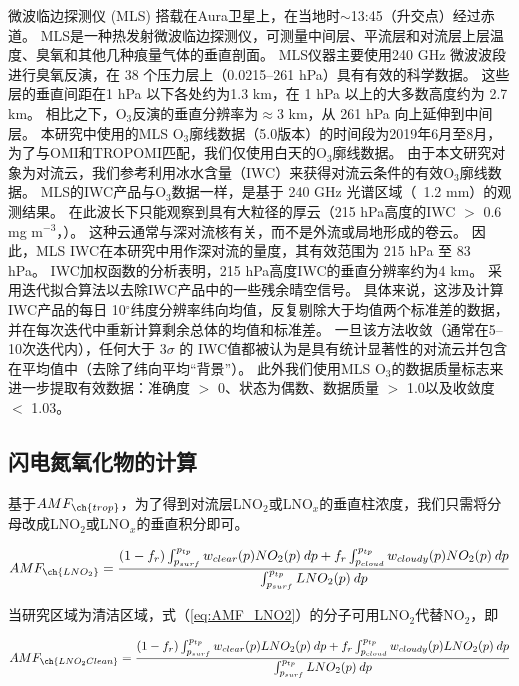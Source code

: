 微波临边探测仪 (MLS) 搭载在Aura卫星上，在当地时$\sim$13:45（升交点）经过赤道。
MLS是一种热发射微波临边探测仪，可测量中间层、平流层和对流层上层温度、臭氧和其他几种痕量气体的垂直剖面。
MLS仪器主要使用240 GHz 微波波段进行臭氧反演，在 38 个压力层上（0.0215--261 hPa）具有有效的科学数据。
这些层的垂直间距在1 hPa 以下各处约为1.3 km，在 1 hPa 以上的大多数高度约为 2.7 km。
相比之下，O$_3$反演的垂直分辨率为$\approx$3 km，从 261 hPa 向上延伸到中间层。
本研究中使用的MLS O$_3$廓线数据（5.0版本）的时间段为2019年6月至8月，为了与OMI和TROPOMI匹配，我们仅使用白天的O$_3$廓线数据。
由于本文研究对象为对流云，我们参考\citet{Livesey.2013}利用冰水含量（IWC）来获得对流云条件的有效O$_3$廓线数据。
MLS的IWC产品与O$_3$数据一样，是基于 240 GHz 光谱区域（~1.2 mm）的观测结果。
在此波长下只能观察到具有大粒径的厚云（215 hPa高度的IWC $>$ 0.6 mg m$^{-3}$，\citep{Wu.2008}）。 这种云通常与深对流核有关，而不是外流或局地形成的卷云。
因此，MLS IWC在本研究中用作深对流的量度，其有效范围为 215 hPa 至 83 hPa。
IWC加权函数的分析表明，215 hPa高度IWC的垂直分辨率约为4 km\citep{Wu.2008}。
\citet{Livesey.2013}采用迭代拟合算法以去除IWC产品中的一些残余晴空信号。
具体来说，这涉及计算IWC产品的每日 10$^{\circ}$纬度分辨率纬向均值，反复剔除大于均值两个标准差的数据，
并在每次迭代中重新计算剩余总体的均值和标准差。
一旦该方法收敛（通常在5--10次迭代内），任何大于 3$\sigma$ 的 IWC值都被认为是具有统计显著性的对流云并包含在平均值中（去除了纬向平均“背景”）。
此外我们使用MLS O$_3$的数据质量标志来进一步提取有效数据：准确度 $>$ 0、状态为偶数、数据质量 $>$ 1.0以及收敛度 $<$ 1.03。


\subsection{闪电氮氧化物的计算} \label{sec:amf_definition}

基于$AMF_{\ch{trop}}$，为了得到对流层LNO$_2$或LNO$_x$的垂直柱浓度，我们只需将分母改成LNO$_2$或LNO$_x$的垂直积分即可。

\begin{equation} \label{eq:AMF_LNO2}
AMF_{\ch{LNO_2}} = \frac{(1-f_r) \int_{p_{surf}}^{p_{tp}} w_{clear}(p) NO_2(p) \: dp + f_r \int_{p_{cloud}}^{p_{tp}} w_{cloudy}(p) NO_2(p) \: dp}{\int_{p_{surf}}^{p_{tp}} LNO_2(p) \: dp}
\end{equation}

当研究区域为清洁区域，式（\ref{eq:AMF_LNO2}）的分子可用LNO$_2$代替NO$_2$，即

\begin{equation} \label{eq:AMF_LNO2clean}
AMF_{\ch{LNO_2Clean}} = \frac{(1-f_r) \int_{p_{surf}}^{p_{tp}} w_{clear}(p) LNO_2(p) \: dp + f_r \int_{p_{cloud}}^{p_{tp}} w_{cloudy}(p) LNO_2(p) \: dp}{\int_{p_{surf}}^{p_{tp}} LNO_2(p) \: dp}
\end{equation}

